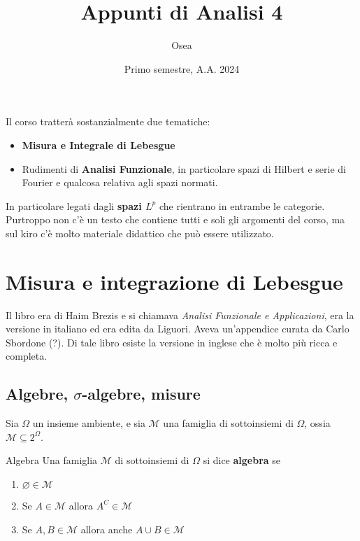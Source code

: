 
\title{Appunti di Analisi 4}
\author{Osea}
\date{Primo semestre, A.A. 2024}

\maketitle


Il corso tratterà sostanzialmente due tematiche:
\begin{itemize}[label = --]
    \item \textbf{Misura e Integrale di Lebesgue}
    \item Rudimenti di \textbf{Analisi Funzionale}, in particolare spazi di
        Hilbert e serie di Fourier e qualcosa relativa agli spazi normati.
\end{itemize}
In particolare legati dagli \textbf{spazi \(L^{p}\)} che rientrano in entrambe
le categorie.
Purtroppo non c'è un testo che contiene tutti e soli gli argomenti del corso, ma
sul kiro c'è molto materiale didattico che può essere utilizzato.


\tableofcontents
\newpage

\section{Misura e integrazione di Lebesgue}
Il libro era di Haim Brezis e si chiamava \emph{Analisi Funzionale e
Applicazioni}, era la versione in italiano ed era edita da Liguori. Aveva
un'appendice curata da Carlo Sbordone (?). Di tale libro esiste la versione in
inglese che è molto più ricca e completa.
\subsection{Algebre, \(\sigma\)-algebre, misure}
Sia \(\Omega\) un insieme ambiente, e sia \(\mathcal{M}\) una famiglia di
sottoinsiemi di \(\Omega\), ossia \(\mathcal{M} \subseteq 2^{\Omega} \).
\begin{definition}{Algebra}
    Una famiglia \(\mathcal{M}\) di sottoinsiemi di \(\Omega\) si dice
    \textbf{algebra} se
\begin{enumerate}[label = \arabic*.]
    \item \(\varnothing \in \mathcal{M} \) 
    \item Se \(A \in \mathcal{M}\) allora \(A^{C} \in \mathcal{M}\) 
    \item Se \(A, B \in \mathcal{M}\) allora anche \(A \cup B \in \mathcal{M}\) 
\end{enumerate}
\end{definition}

